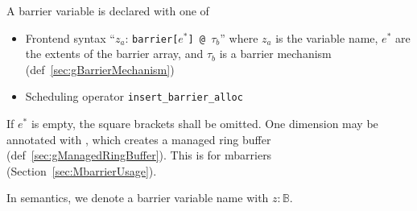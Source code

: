 
A barrier variable is declared with one of
\begin{itemize}
  \item Frontend syntax ``$z_a$: \texttt{barrier[$e^*$] @ }$\tau_b$'' where $z_a$ is the variable name, $e^*$ are the extents of the barrier array, and $\tau_b$ is a barrier mechanism (def~\ref{sec:gBarrierMechanism})
  \item Scheduling operator \texttt{insert\_barrier\_alloc}
\end{itemize}
If $e^*$ is empty, the square brackets shall be omitted.
One dimension may be annotated with , which creates a managed ring buffer (def~\ref{sec:gManagedRingBuffer}).
This is for mbarriers (Section~\ref{sec:MbarrierUsage}).

In semantics, we denote a barrier variable name with $z: \mathbb{B}$.


